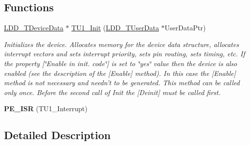 \subsection*{Functions}
\begin{DoxyCompactItemize}
\item 
\hyperlink{group___p_e___types__module_gac5cf1362f1f0e3a2ce71b1bf2276d091}{L\-D\-D\-\_\-\-T\-Device\-Data} $\ast$ \hyperlink{group___t_u1__module_ga9bfbdf45fe9128c8d9e4245e3480d6da}{T\-U1\-\_\-\-Init} (\hyperlink{group___p_e___types__module_ga0b66a73f87238a782318aa0be7578e35}{L\-D\-D\-\_\-\-T\-User\-Data} $\ast$User\-Data\-Ptr)
\begin{DoxyCompactList}\small\item\em Initializes the device. Allocates memory for the device data structure, allocates interrupt vectors and sets interrupt priority, sets pin routing, sets timing, etc. If the property \mbox{[}\char`\"{}\-Enable in init. code\char`\"{}\mbox{]} is set to \char`\"{}yes\char`\"{} value then the device is also enabled (see the description of the \mbox{[}Enable\mbox{]} method). In this case the \mbox{[}Enable\mbox{]} method is not necessary and needn't to be generated. This method can be called only once. Before the second call of Init the \mbox{[}Deinit\mbox{]} must be called first. \end{DoxyCompactList}\item 
\hypertarget{group___t_u1__module_gaa41b92c05e2ee5c591e4960928551eb0}{{\bfseries P\-E\-\_\-\-I\-S\-R} (T\-U1\-\_\-\-Interrupt)}\label{group___t_u1__module_gaa41b92c05e2ee5c591e4960928551eb0}

\end{DoxyCompactItemize}


\subsection{Detailed Description}


